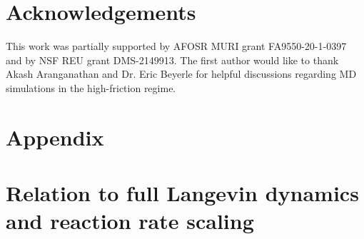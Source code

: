 \documentclass[reqno, 12pt]{article}
\begin{document}
 \section{Acknowledgements}
 This work was partially supported by AFOSR MURI grant FA9550-20-1-0397 and by 
  NSF REU grant DMS-2149913. The first author would like to thank Akash Aranganathan and Dr. Eric Beyerle for helpful discussions regarding MD simulations in the high-friction regime. 



 \appendix
\setcounter{equation}{0}
\renewcommand{\theequation}{\Alph{section}-\arabic{equation}}
    \setcounter{lemma}{0}
    \renewcommand{\thelemma}{\Alph{section}\arabic{lemma}}

\section*{Appendix}


\section{Relation to full Langevin dynamics and reaction rate scaling} 
\label{app: A}
\end{document}
